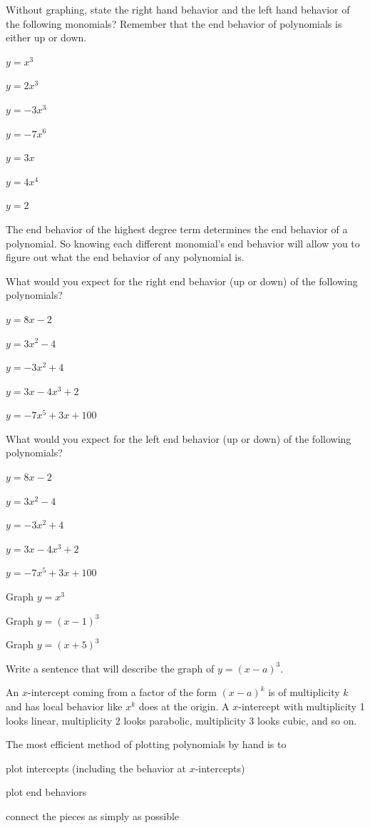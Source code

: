 \bq Without graphing, state the right hand behavior and the left hand behavior of the following monomials? Remember that the end behavior of polynomials is either up or down.
\be
\item $y=x^3$
\item $y=2x^3$
\item $y=-3x^3$
\item $y=-7x^6$
\item $y=3x$
\item $y=4x^4$
\item $y=2$
\ee \eq

\begin{info}
The end behavior of the highest degree term determines the end behavior of a polynomial. So knowing each different monomial's end behavior will allow you to figure out what the end behavior of any polynomial is.
\end{info}


\bq What would you expect for the right end behavior (up or down) of the following polynomials?
\be
\item$y= 8x-2$
\item $y=3x^2-4$
\item $y=-3x^2+4$
\item $y=3x-4x^3+2$
\item $y=-7x^5+3x+100$
\ee
\eq

\bq What would you expect for the left end behavior (up or down) of the following polynomials?
\be
\item $y= 8x-2$
\item $y=3x^2-4$
\item $y=-3x^2+4$
\item $y=3x-4x^3+2$
\item $y=-7x^5+3x+100$
\ee
\eq

\bq
\be
\item Graph $y=x^3$
\item Graph $y=(x-1)^3$
\item Graph $y=(x+5)^3$
\item Write a sentence that will describe the graph of $y=(x-a)^3$.
\ee \eq

\begin{info}
An $x$-intercept coming from a factor of the form $(x-a)^k$ is of multiplicity $k$ and has local behavior like $x^k$ does at the origin. A $x$-intercept with multiplicity 1 looks linear, multiplicity 2 looks parabolic, multiplicity 3 looks cubic, and so on.

The most efficient method of plotting polynomials by hand is to
\be
\item plot intercepts (including the behavior at $x$-intercepts)
\item plot end behaviors
\item connect the pieces as simply as possible
\ee
\end{info}

